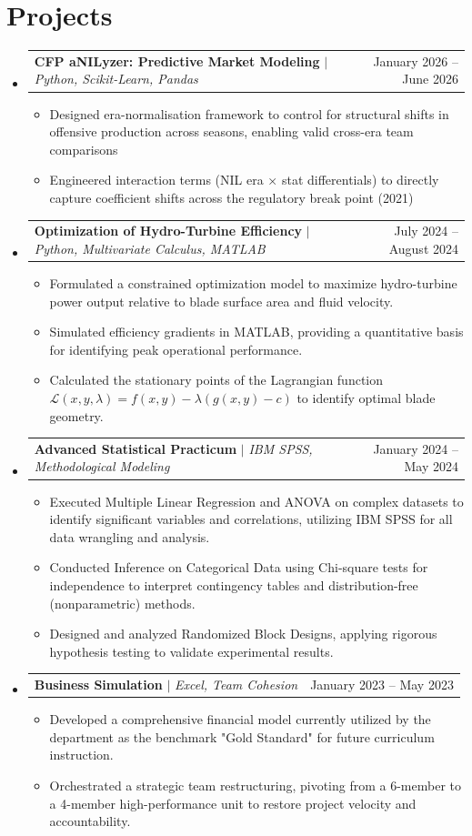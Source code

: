 \documentclass[letterpaper,11pt]{article}
\makeatletter
\newcommand{\resumeItem}[1]{
  \item\small{
    {#1 \vspace{-2pt}}
  }
}
\newcommand{\resumeProjectHeading}[2]{
    \item
    \begin{tabular*}{0.97\textwidth}{l@{\extracolsep{\fill}}r}
      \small#1 & #2 \\
    \end{tabular*}\vspace{-7pt}
}
\newcommand{\resumeSubHeadingListStart}{\begin{itemize}[leftmargin=0.15in, label={}]}
\newcommand{\resumeSubHeadingListEnd}{\end{itemize}}
\newcommand{\resumeItemListStart}{\begin{itemize}}
\newcommand{\resumeItemListEnd}{\end{itemize}\vspace{-5pt}}
\makeatother
\begin{document}
\section{Projects}
    \resumeSubHeadingListStart
     \resumeProjectHeading
          {\textbf{CFP aNILyzer: Predictive Market Modeling} $|$ \emph{Python, Scikit-Learn, Pandas}}{January 2026 -- June 2026}
          \resumeItemListStart
            \resumeItem{Designed era-normalisation framework to control for structural shifts in offensive production across seasons, enabling valid cross-era team comparisons}
            \resumeItem{Engineered interaction terms (NIL era × stat differentials) to directly capture coefficient shifts across the regulatory break point (2021)}
          \resumeItemListEnd
      \resumeProjectHeading
          {\textbf{Optimization of Hydro-Turbine Efficiency} $|$ \emph{Python, Multivariate Calculus, MATLAB}}{July 2024 -- August 2024}
          \resumeItemListStart
            \resumeItem{Formulated a constrained optimization model to maximize hydro-turbine power output relative to blade surface area and fluid velocity.}
            \resumeItem{Simulated efficiency gradients in MATLAB, providing a quantitative basis for identifying peak operational performance.}
            \resumeItem{Calculated the stationary points of the Lagrangian function $\mathcal{L}(x, y, \lambda) = f(x, y) - \lambda(g(x, y) - c)$ to identify optimal blade geometry.}
          \resumeItemListEnd
      \resumeProjectHeading
          {\textbf{Advanced Statistical Practicum} $|$ \emph{IBM SPSS, Methodological Modeling}}{January 2024 -- May 2024}
          \resumeItemListStart
            \resumeItem{Executed Multiple Linear Regression and ANOVA on complex datasets to identify significant variables and correlations, utilizing IBM SPSS for all data wrangling and analysis.}
            \resumeItem{Conducted Inference on Categorical Data using Chi-square tests for independence to interpret contingency tables and distribution-free (nonparametric) methods.}
            \resumeItem{Designed and analyzed Randomized Block Designs, applying rigorous hypothesis testing to validate experimental results.}
          \resumeItemListEnd
    
          \resumeProjectHeading
          {\textbf{Business Simulation} $|$ \emph{Excel, Team Cohesion}}{January 2023 -- May 2023}
          \resumeItemListStart
            \resumeItem{Developed a comprehensive financial model currently utilized by the department as the benchmark "Gold Standard" for future curriculum instruction.}
            \resumeItem{Orchestrated a strategic team restructuring, pivoting from a 6-member to a 4-member high-performance unit to restore project velocity and accountability.}
          \resumeItemListEnd
    \resumeSubHeadingListEnd
\end{document}
